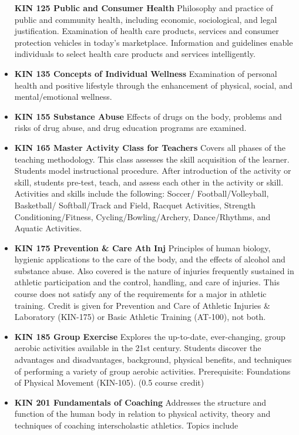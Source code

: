 \documentclass[
  letterpaper,
]{scrbook}
\begin{document}
\begin{itemize}
  \textbf{KIN 125 Public and Consumer Health} Philosophy and practice of
  public and community health, including economic, sociological, and
  legal justification. Examination of health care products, services and
  consumer protection vehicles in today's marketplace. Information and
  guidelines enable individuals to select health care products and
  services intelligently.
\item
  \textbf{KIN 135 Concepts of Individual Wellness} Examination of
  personal health and positive lifestyle through the enhancement of
  physical, social, and mental/emotional wellness.
\item
  \textbf{KIN 155 Substance Abuse} Effects of drugs on the body,
  problems and risks of drug abuse, and drug education programs are
  examined.
\item
  \textbf{KIN 165 Master Activity Class for Teachers} Covers all phases
  of the teaching methodology. This class assesses the skill acquisition
  of the learner. Students model instructional procedure. After
  introduction of the activity or skill, students pre-test, teach, and
  assess each other in the activity or skill. Activities and skills
  include the following: Soccer/ Football/Volleyball, Basketball/
  Softball/Track and Field, Racquet Activities, Strength
  Conditioning/Fitness, Cycling/Bowling/Archery, Dance/Rhythms, and
  Aquatic Activities.
\item
  \textbf{KIN 175 Prevention \& Care Ath Inj} Principles of human
  biology, hygienic applications to the care of the body, and the
  effects of alcohol and substance abuse. Also covered is the nature of
  injuries frequently sustained in athletic participation and the
  control, handling, and care of injuries. This course does not satisfy
  any of the requirements for a major in athletic training. Credit is
  given for Prevention and Care of Athletic Injuries \& Laboratory
  (KIN-175) or Basic Athletic Training (AT-100), not both.
\item
  \textbf{KIN 185 Group Exercise} Explores the up-to-date,
  ever-changing, group aerobic activities available in the 21st century.
  Students discover the advantages and disadvantages, background,
  physical benefits, and techniques of performing a variety of group
  aerobic activities. Prerequisite: Foundations of Physical Movement
  (KIN-105). (0.5 course credit)
\item
  \textbf{KIN 201 Fundamentals of Coaching} Addresses the structure and
  function of the human body in relation to physical activity, theory
  and techniques of coaching interscholastic athletics. Topics include

\end{itemize}
\end{document}
